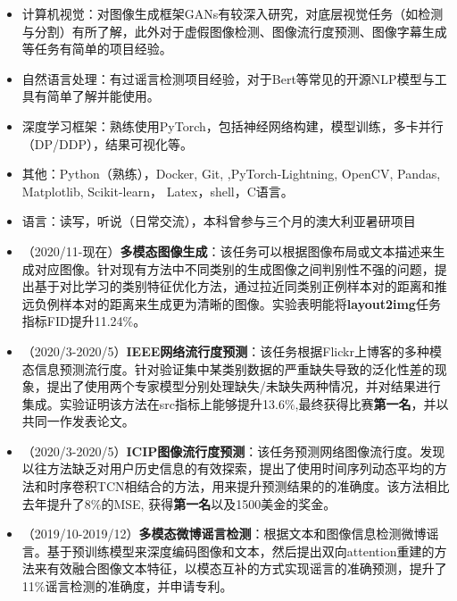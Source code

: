 \documentclass[zh]{resume}
\begin{document}
\begin{itemize}
  \item 计算机视觉：对图像生成框架GANs有较深入研究，对底层视觉任务（如检测与分割）有所了解，此外对于虚假图像检测、图像流行度预测、图像字幕生成等任务有简单的项目经验。
  \item 自然语言处理：有过谣言检测项目经验，对于Bert等常见的开源NLP模型与工具有简单了解并能使用。
  \item 深度学习框架：熟练使用PyTorch，包括神经网络构建，模型训练，多卡并行（DP/DDP），结果可视化等。
  \item 其他：Python（熟练），Docker, Git, ,PyTorch-Lightning, OpenCV, Pandas, Matplotlib, Scikit-learn， Latex，shell，C语言。
  \item 语言：读写，听说（日常交流），本科曾参与三个月的澳大利亚暑研项目
\end{itemize}

\begin{itemize}
  \item  （2020/11-现在）\textbf{多模态图像生成}：该任务可以根据图像布局或文本描述来生成对应图像。针对现有方法中不同类别的生成图像之间判别性不强的问题，提出基于对比学习的类别特征优化方法，通过拉近同类别正例样本对的距离和推远负例样本对的距离来生成更为清晰的图像。实验表明能将\textbf{layout2img}任务指标FID提升11.24$\%$。
  \item （2020/3-2020/5）\textbf{IEEE网络流行度预测}：该任务根据Flickr上博客的多种模态信息预测流行度。针对验证集中某类别数据的严重缺失导致的泛化性差的现象，提出了使用两个专家模型分别处理缺失/未缺失两种情况，并对结果进行集成。实验证明该方法在src指标上能够提升13.6$\%$,最终获得比赛\textbf{第一名}，并以共同一作发表论文。
  \item （2020/3-2020/5）\textbf{ICIP图像流行度预测}：该任务预测网络图像流行度。发现以往方法缺乏对用户历史信息的有效探索，提出了使用时间序列动态平均的方法和时序卷积TCN相结合的方法，用来提升预测结果的的准确度。该方法相比去年提升了8$\%$的MSE, 获得\textbf{第一名}以及1500美金的奖金。
  \item （2019/10-2019/12）\textbf{多模态微博谣言检测}：根据文本和图像信息检测微博谣言。基于预训练模型来深度编码图像和文本，然后提出双向attention重建的方法来有效融合图像文本特征，以模态互补的方式实现谣言的准确预测，提升了11$\%$谣言检测的准确度，并申请专利。

\end{itemize}
\end{document}
